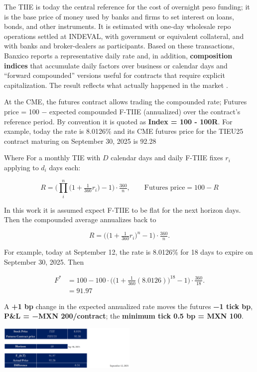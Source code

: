 \documentclass[11pt,a4paper]{article} %
\begin{document}
The TIIE is today the central reference for the cost of overnight peso funding; it is the base price of money used by banks and firms to set interest on loans, bonds, and other instruments. It is estimated with one-day wholesale repo operations settled at INDEVAL, with government or equivalent collateral, and with banks and broker-dealers as participants. Based on these transactions, Banxico reports a representative daily rate and, in addition, \textbf{composition indices} that accumulate daily factors over business or calendar days and ``forward compounded'' versions useful for contracts that require explicit capitalization. The result reflects what actually happened in the market \citep{banxico_methodology,banxico_indices}.

At the CME, the futures contract allows trading the compounded rate; Futures price = 100 − expected compounded F-TIIE (annualized) over the contract’s reference period. By convention it is quoted as \textbf{Index = 100 - 100R}. For example, today the rate is 8.0126\% and its CME futures price for the TIEU25 contract maturing on September 30, 2025 is 92.28

Where For a monthly TIE with $D$ calendar days and daily F-TIIE fixes $r_i$ applying to $d_i$ days each:

  $$
  R=\Bigg(\prod_{i}^n\big(1+\tfrac{1}{360}r_i\big)-1\Bigg)\cdot \tfrac{360}{n},\qquad
  {\text{Futures price}=100-R}
  $$

In this work it is assumed expect F-TIIE to be flat for the next horizon days. Then the compounded average annualizes back to

$$
R=\Bigg(\big(1+\tfrac{1}{360}r_i\big)^n-1\Bigg)\cdot \tfrac{360}{n}.
$$

For example, today at September 12, the rate is 8.0126\% for 18 days to expire on September 30, 2025. Then  

\begin{align*}
  F^* &= 100 - 100\cdot \Bigg(\big(1+\tfrac{1}{360}(8.0126)\big)^{18}-1\Bigg)\cdot \tfrac{360}{18}. \\
  & = 91.97
\end{align*}


A \textbf{+1 bp} change in the expected annualized rate moves the futures \textbf{−1 tick bp}, \textbf{P\&L = −MXN 200/contract}; the \textbf{minimum tick 0.5 bp = MXN 100}.

\begin{center}
\includegraphics[width=0.5\textwidth]{figures/tiie_pricing_sep12.png}
\end{center}
\end{document}
